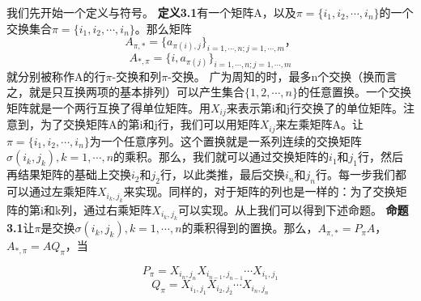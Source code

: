 \documentclass{article}
\begin{document}
我们先开始一个定义与符号。
\newline
\textbf{定义3.1}有一个矩阵A，以及$\pi =\{i_1,i_2,\cdots ,i_n\}$的一个交换集合$\pi =\{i_1,i_2,\cdots ,i_n\}$。那么矩阵$$A_{\pi ,*}=\{ a_{\pi(i),j} \}_{i=1,\cdots ,n;j=1,\cdots ,m}，$$
$$A_{*,\pi }=\{i, a_{\pi(j)} \}_{i=1,\cdots ,n;j=1,\cdots ,m}$$就分别被称作A的行$\pi$-交换和列$\pi$-交换。
\newline
广为周知的时，最多n个交换（换而言之，就是只互换两项的基本排列）可以产生集合$\{1,2,\cdots,n\}$的任意置换。一个交换矩阵就是一个两行互换了得单位矩阵。用$X_{ij}$来表示第i和j行交换了的单位矩阵。注意到，为了交换矩阵A的第i和j行，我们可以用矩阵$X_{ij}$来左乘矩阵A。让$\pi=\{i_1,i_2,\cdots,i_n\}$为一个任意序列。这个置换就是一系列连续的交换矩阵$\sigma(i_k,j_k),k=1,\cdots,n$的乘积。那么，我们就可以通过交换矩阵的$i_1$和$j_1$行，然后再结果矩阵的基础上交换$i_2$和$j_2$行，以此类推，最后交换$i_n$和$j_n$行。每一步我们都可以通过左乘矩阵$X_{i_k,j_k}$来实现。同样的，对于矩阵的列也是一样的：为了交换矩阵的第i和k列，通过右乘矩阵$X_{i_k,j_k}$可以实现。从上我们可以得到下述命题。
\newline
\textbf{命题3.1}让$\pi$是交换$\sigma(i_k,j_k),k=1,\cdots,n$的乘积得到的置换。那么，$A_{\pi,*}=P_{\pi}A$，$A_{*,\pi}=AQ_{\pi}$，当


\begin{equation}
P_{\pi}=X_{i_n,j_n}X_{i_{n-1},j_{n-1}}\cdots X_{i_1,j_1}  \tag{3.1}
\end{equation}
\begin{equation}
Q_{\pi}=X_{i_1,j_1}X_{i_{2},j_{2}}\cdots X_{i_n,j_n} \tag{3.2}
\end{equation}
\end{document}
